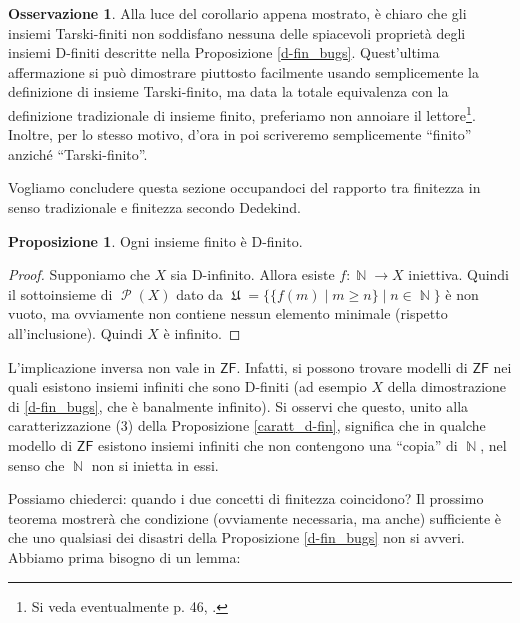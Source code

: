 \documentclass[12pt,a4paper]{report}
\theoremstyle{definition}
\newtheorem{oss}[teo]{Osservazione}  %
\newtheorem{prop}[teo]{Proposizione}  %
\theoremstyle{num.custom-title}
\DeclareMathOperator{\PP}{\mathcal{P}}
\DeclareMathOperator{\N}{\mathbb{N}}
\DeclareMathOperator{\U}{\mathfrak{U}}
\newcommand{\ZF}{\ensuremath{\mathsf{ZF}}\xspace}
\begin{document}
\begin{oss}\label{oss_fin=t-fin}
Alla luce del corollario appena mostrato, è chiaro che gli insiemi Tarski-finiti non soddisfano nessuna delle spiacevoli proprietà degli insiemi D-finiti descritte nella Proposizione \ref{d-fin_bugs}. Quest'ultima affermazione si può dimostrare piuttosto facilmente usando semplicemente la definizione di insieme Tarski-finito, ma data la totale equivalenza con la definizione tradizionale di insieme finito, preferiamo non annoiare il lettore\footnote{Si veda eventualmente p. 46, \cite{Herrlich:Herrlich}.}. Inoltre, per lo stesso motivo, d'ora in poi scriveremo semplicemente ``finito'' anziché ``Tarski-finito''.
\end{oss}

Vogliamo concludere questa sezione occupandoci del rapporto tra finitezza in senso tradizionale e finitezza secondo Dedekind.

\begin{prop}\label{fin_imp_d-fin}
Ogni insieme finito è D-finito.
\begin{proof}
Supponiamo che $X$ sia D-infinito. Allora esiste $f: \N \to X$ iniettiva. Quindi il sottoinsieme di $\PP(X)$ dato da $\U=\{\{f(m) \mid m \geq n\} \mid n \in \N\}$ è non vuoto, ma ovviamente non contiene nessun elemento minimale (rispetto all'inclusione). Quindi $X$ è infinito.
\end{proof}
\end{prop}

L'implicazione inversa non vale in \ZF. Infatti, si possono trovare modelli di \ZF nei quali esistono insiemi infiniti che sono D-finiti (ad esempio $X$ della dimostrazione di \ref{d-fin_bugs}, che è banalmente infinito). Si osservi che questo, unito alla caratterizzazione (3) della Proposizione \ref{caratt_d-fin}, significa che in qualche modello di \ZF esistono insiemi infiniti che non contengono una ``copia'' di $\N$, nel senso che $\N$ non si inietta in essi. 

Possiamo chiederci: quando i due concetti di finitezza coincidono? Il prossimo teorema mostrerà che condizione (ovviamente necessaria, ma anche) sufficiente è che uno qualsiasi dei disastri della Proposizione \ref{d-fin_bugs} non si avveri. Abbiamo prima bisogno di un lemma:
\end{document}
